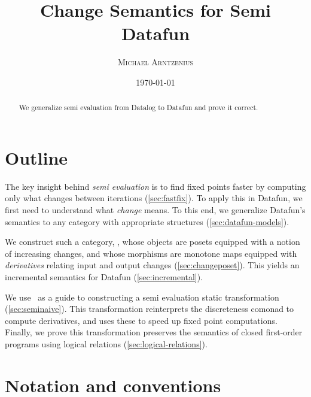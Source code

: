 \title{Change Semantics for Semi\naive{} Datafun}
\author{\scshape Michael Arntzenius}
\date{\today}

\maketitle

\begin{abstract}
  We generalize semi\naive{} evaluation from Datalog to Datafun and prove it
  correct.
\end{abstract}

\section{Outline}

The key insight behind \emph{semi\naive{} evaluation} is to find fixed points
faster by computing only what changes between iterations (\cref{sec:fastfix}).
To apply this in Datafun, we first need to understand what \emph{change} means.
%
To this end, we generalize Datafun's \Poset{} semantics to any category with
appropriate structures (\cref{sec:datafun-models}).

We construct such a category, \CP{}, whose objects are posets equipped with a
notion of increasing changes, and whose morphisms are monotone maps equipped
with \emph{derivatives} relating input and output changes
(\cref{sec:changeposet}). This yields an incremental semantics for Datafun
(\cref{sec:incremental}). 

We use \CP\ as a guide to constructing a semi\naive{} evaluation static
transformation (\cref{sec:seminaive}). This transformation reinterprets the
discreteness comonad to compute derivatives, and uses these to speed up fixed
point computations. Finally, we prove this transformation preserves the
semantics of closed first-order programs using logical relations
(\cref{sec:logical-relations}).



\section{Notation and conventions}

